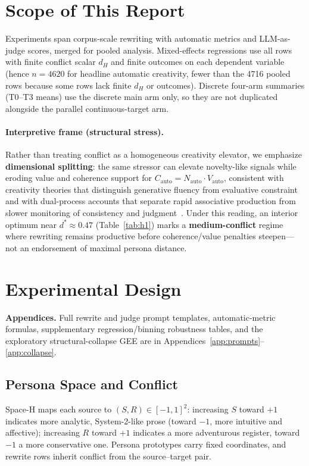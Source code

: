 \documentclass[sigconf,nonacm]{acmart}
\begin{document}
\section{Scope of This Report}

Experiments span corpus-scale rewriting with automatic metrics and LLM-as-judge scores, merged for pooled analysis.
Mixed-effects regressions use all rows with finite conflict scalar $d_H$ and finite outcomes on each dependent variable (hence $n{=}4620$ for headline automatic creativity, fewer than the 4716 pooled rows because some rows lack finite $d_H$ or outcomes).
Discrete four-arm summaries (T0--T3 means) use the discrete main arm only, so they are not duplicated alongside the parallel continuous-target arm.

\paragraph{Interpretive frame (structural stress).}
Rather than treating conflict as a homogeneous creativity elevator, we emphasize \textbf{dimensional splitting}: the same stressor can elevate novelty-like signals while eroding value and coherence support for $C_{\mathrm{auto}}{=}N_{\mathrm{auto}}{\cdot}V_{\mathrm{auto}}$, consistent with creativity theories that distinguish generative fluency from evaluative constraint~\cite{boden} and with dual-process accounts that separate rapid associative production from slower monitoring of consistency and judgment~\cite{kahneman}.
Under this reading, an interior optimum near $d^\ast{\approx}0.47$ (Table~\ref{tab:h1}) marks a \textbf{medium-conflict} regime where rewriting remains productive before coherence/value penalties steepen---not an endorsement of maximal persona distance.

\section{Experimental Design}

\noindent\textbf{Appendices.}
Full rewrite and judge prompt templates, automatic-metric formulas, supplementary regression/binning robustness tables, and the exploratory structural-collapse GEE are in Appendices~\ref{app:prompts}--\ref{app:collapse}.

\subsection{Persona Space and Conflict}

Space-H maps each source to $(S,R)\in[-1,1]^2$: increasing $S$ toward $+1$ indicates more analytic, System-2-like prose (toward $-1$, more intuitive and affective); increasing $R$ toward $+1$ indicates a more adventurous register, toward $-1$ a more conservative one. Persona prototypes carry fixed coordinates, and rewrite rows inherit conflict from the source--target pair.
\end{document}
